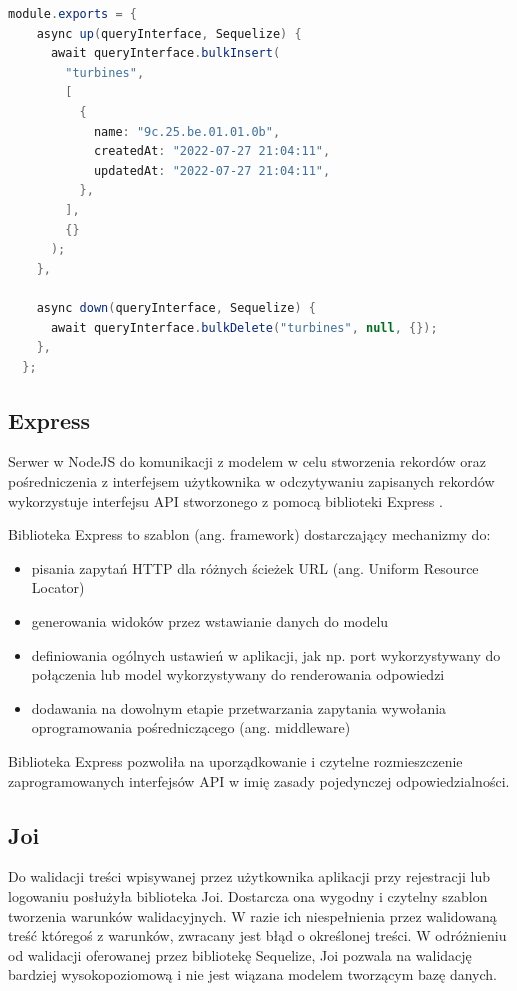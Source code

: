\documentclass{sprz}
\begin{document}
\begin{lstlisting}[language=Java,caption={Przykład pliku seeder}, label={lst:Sequelize_seeder}]
  module.exports = {
    async up(queryInterface, Sequelize) {
      await queryInterface.bulkInsert(
        "turbines",
        [
          {
            name: "9c.25.be.01.01.0b",
            createdAt: "2022-07-27 21:04:11",
            updatedAt: "2022-07-27 21:04:11",
          },
        ],
        {}
      );
    },
  
    async down(queryInterface, Sequelize) {
      await queryInterface.bulkDelete("turbines", null, {});
    },
  };
\end{lstlisting}

\subsection{Express}

Serwer w NodeJS do komunikacji z modelem w celu stworzenia rekordów oraz pośredniczenia z interfejsem użytkownika w odczytywaniu zapisanych rekordów wykorzystuje interfejsu API stworzonego z pomocą biblioteki Express \cite{express}.

Biblioteka Express to szablon (ang. framework) dostarczający mechanizmy do:
\begin{itemize}
  \item pisania zapytań HTTP dla różnych ścieżek URL (ang. Uniform Resource Locator)
  \item generowania widoków przez wstawianie danych do modelu
  \item definiowania ogólnych ustawień w aplikacji, jak np. port wykorzystywany do połączenia lub model wykorzystywany do renderowania odpowiedzi
  \item dodawania na dowolnym etapie przetwarzania zapytania wywołania oprogramowania pośredniczącego (ang. middleware)
\end{itemize}

Biblioteka Express pozwoliła na uporządkowanie i czytelne rozmieszczenie zaprogramowanych interfejsów API w imię zasady pojedynczej odpowiedzialności.

\subsection{Joi}

Do walidacji treści wpisywanej przez użytkownika aplikacji przy rejestracji lub logowaniu posłużyła biblioteka Joi. Dostarcza ona wygodny i czytelny szablon tworzenia warunków walidacyjnych. W razie ich niespełnienia przez walidowaną treść któregoś z warunków, zwracany jest błąd o określonej treści. W odróżnieniu od walidacji oferowanej przez bibliotekę Sequelize, Joi pozwala na walidację bardziej wysokopoziomową i nie jest wiązana modelem tworzącym bazę danych.
\end{document}
